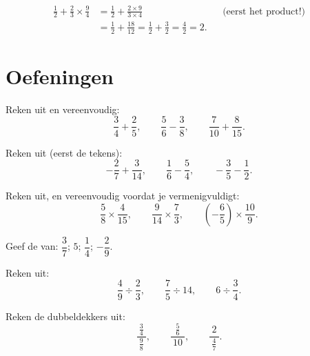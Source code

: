 \begin{example}\label{ex:g8:fractions:mixed}
\begin{align*}
\frac12 + \frac{2}{3} \times \frac{9}{4}
&= \frac12 + \frac{2 \times 9}{3 \times 4}
&& \text{(eerst het product!)} \\
&= \frac12 + \frac{18}{12} = \frac12 + \frac32
= \frac{4}{2} = 2 .
\end{align*}
\end{example}

\section{Oefeningen}

\begin{exercise}[$\star$]\label{exo:g8:fractions:1}
Reken uit en vereenvoudig:
\[
\frac{3}{4} + \frac{2}{5}, \qquad
\frac{5}{6} - \frac{3}{8}, \qquad
\frac{7}{10} + \frac{8}{15} .
\]
\end{exercise}

\begin{exercise}[$\star$]\label{exo:g8:fractions:2}
Reken uit (eerst de tekens):
\[
-\frac{2}{7} + \frac{3}{14}, \qquad
\frac{1}{6} - \frac{5}{4}, \qquad
-\frac{3}{5} - \frac{1}{2} .
\]
\end{exercise}

\begin{exercise}[$\star$]\label{exo:g8:fractions:3}
Reken uit, en vereenvoudig voordat je vermenigvuldigt:
\[
\frac{5}{8} \times \frac{4}{15}, \qquad
\frac{9}{14} \times \frac{7}{3}, \qquad
\left(-\frac{6}{5}\right) \times \frac{10}{9} .
\]
\end{exercise}

\begin{exercise}[$\star$]\label{exo:g8:fractions:4}
Geef de  van: $\dfrac{3}{7}$; \quad $5$; \quad $\dfrac{1}{4}$; \quad
$-\dfrac{2}{9}$.
\end{exercise}

\begin{exercise}[$\star$]\label{exo:g8:fractions:5}
Reken uit:
\[
\frac{4}{9} \div \frac{2}{3}, \qquad
\frac{7}{5} \div 14, \qquad
6 \div \frac{3}{4} .
\]
\end{exercise}

\begin{exercise}[$\star$]\label{exo:g8:fractions:6}
Reken de dubbeldekkers uit:
\[
\frac{\ \frac{3}{4}\ }{\ \frac{9}{8}\ },
\qquad
\frac{\ \frac{5}{6}\ }{\ 10\ },
\qquad
\frac{\ 2\ }{\ \frac{4}{7}\ } .
\]
\end{exercise}

